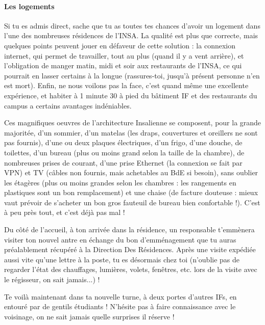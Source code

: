 \paragraph{Les logements}
Si tu es admis direct, sache que tu as toutes tes chances d'avoir un logement
dans l'une des nombreuses résidences de l'INSA. La qualité est plus que correcte,
mais quelques points peuvent jouer en défaveur de cette solution : la connexion internet, qui
permet de travailler, tout au plus (quand il y a
vent arrière), et l'obligation de manger matin, midi et soir aux
restaurants de l'INSA, ce qui pourrait en lasser certains à la longue (rassures-toi, jusqu'à présent personne n'en est mort).
Enfin, ne nous voilons pas la face, c'est quand même une excellente expérience,
et habiter à 1 minute 30 à pied du bâtiment IF et des restaurants du campus a certains avantages indéniables.

\vspace{1em}

Ces magnifiques oeuvres de l'architecture Insalienne se composent, pour la
grande majoritée, d'un sommier, d'un matelas (les draps, couvertures et
oreillers ne sont pas fournis), d'une ou deux plaques électriques, d'un frigo,
d'une douche, de toilettes, d'un bureau (plus ou moins grand selon la taille de la
chambre), de nombreuses prises de courant, d'une prise Ethernet (la
connexion se fait par VPN) et TV (câbles non fournis, mais
achetables au BdE si besoin), sans oublier les étagères (plus ou moins grandes
selon les chambres : les rangements en plastiques sont
un bon remplacement) et une chaise (de facture douteuse : mieux vaut prévoir de
s'acheter un bon gros fauteuil de bureau bien confortable !). C'est à peu près tout, et c'est déjà pas mal !

\vspace{1em}

Du côté de l'accueil, à ton arrivée dans la résidence, un responsable t'emmènera visiter ton
nouvel antre en échange du bon d'emménagement que tu auras préalablement
récupéré à la Direction Des Résidences. Après une visite expédiée aussi vite
qu'une lettre à la poste, tu es désormais chez toi (n'oublie pas de regarder
l'état des chauffages, lumières, volets, fenêtres,  etc. lors de la visite
avec le régisseur, on sait jamais...) !

\vspace{1em}

Te voilà maintenant dans ta nouvelle turne, à deux portes d'autres IFs, en entouré par de gentils étudiants !
N'hésite pas à faire connaissance avec le voisinage, on ne sait jamais quelle surprises il réserve !
